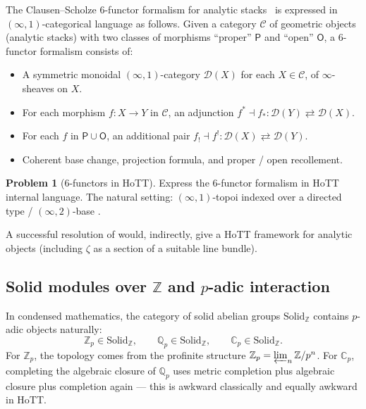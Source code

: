 \documentclass[12pt]{article}
\theoremstyle{definition}
\newtheorem{problem}[theorem]{Problem}
\theoremstyle{remark}
\newcommand{\C}{\mathbb{C}}
\newcommand{\Q}{\mathbb{Q}}
\newcommand{\Z}{\mathbb{Z}}
\begin{document}
The Clausen--Scholze 6-functor formalism for analytic
stacks~\cite{ClausenScholze2024SixFunctor,ClausenScholze2025AnalyticStacks}
is expressed in $(\infty,1)$-categorical language as follows. Given a category
$\mathcal{C}$ of geometric objects (analytic stacks) with two classes of
morphisms ``proper'' $\mathsf{P}$ and ``open'' $\mathsf{O}$, a 6-functor
formalism consists of:
\begin{itemize}
\item A symmetric monoidal $(\infty,1)$-category $\mathcal{D}(X)$ for each
$X \in \mathcal{C}$, of $\infty$-sheaves on $X$.
\item For each morphism $f: X \to Y$ in $\mathcal{C}$, an adjunction
$f^* \dashv f_*: \mathcal{D}(Y) \rightleftarrows \mathcal{D}(X)$.
\item For each $f$ in $\mathsf{P} \cup \mathsf{O}$, an additional pair
$f_! \dashv f^!: \mathcal{D}(X) \rightleftarrows \mathcal{D}(Y)$.
\item Coherent base change, projection formula, and proper / open
recollement.
\end{itemize}

\begin{problem}[6-functors in HoTT]\label{prob:sixfunc}
Express the 6-functor formalism in HoTT internal language. The natural
setting: $(\infty,1)$-topoi indexed over a directed type / $(\infty,2)$-base
\cite{Riehl2021Elements}.
\end{problem}

A successful resolution of  would, indirectly, give a
HoTT framework for analytic objects (including $\zeta$ as a section of a
suitable line bundle).

\subsection{Solid modules over \texorpdfstring{$\Z$}{Z} and \texorpdfstring{$p$}{p}-adic interaction}\label{subsec:solidp}

In condensed mathematics, the category of solid abelian groups
$\mathrm{Solid}_{\Z}$ contains $p$-adic objects naturally:
\[
\Z_p \in \mathrm{Solid}_{\Z}, \qquad \Q_p \in \mathrm{Solid}_{\Z}, \qquad
\C_p \in \mathrm{Solid}_{\Z}.
\]
For $\Z_p$, the topology comes from the profinite structure
$\Z_p = \varprojlim_n \Z/p^n$. For $\C_p$, completing the algebraic closure
of $\Q_p$ uses metric completion plus algebraic closure plus completion
again — this is awkward classically and equally awkward in HoTT.
\end{document}
